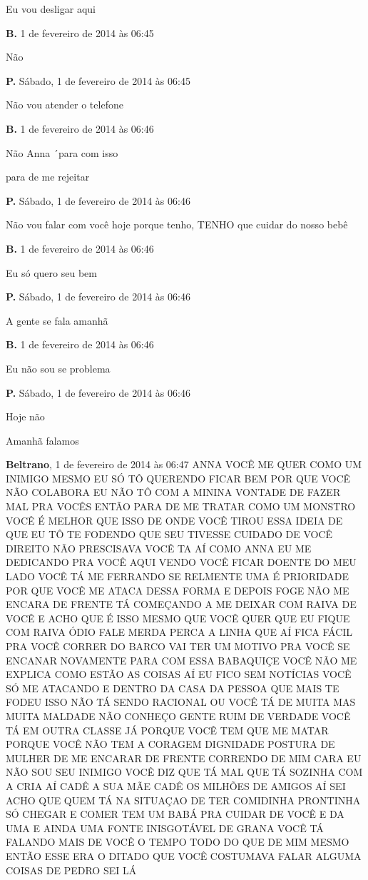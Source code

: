 Eu vou desligar aqui

\textbf{B.} 1 de fevereiro de 2014 às 06:45

Não

\textbf{P.} Sábado, 1 de fevereiro de 2014 às 06:45

Não vou atender o telefone

\textbf{B.} 1 de fevereiro de 2014 às 06:46

Não Anna ´para com isso

para de me rejeitar

\textbf{P.} Sábado, 1 de fevereiro de 2014 às 06:46

Não vou falar com você hoje porque tenho, TENHO que cuidar do nosso bebê

\textbf{B.} 1 de fevereiro de 2014 às 06:46

Eu só quero seu bem

\textbf{P.} Sábado, 1 de fevereiro de 2014 às 06:46

A gente se fala amanhã

\textbf{B.} 1 de fevereiro de 2014 às 06:46

Eu não sou se problema

\textbf{P.} Sábado, 1 de fevereiro de 2014 às 06:46

Hoje não

Amanhã falamos

\textbf{Beltrano}, 1 de fevereiro de 2014 às 06:47 ANNA VOCÊ ME QUER
COMO UM INIMIGO MESMO EU SÓ TÔ QUERENDO FICAR BEM POR QUE VOCÊ NÃO
COLABORA EU NÃO TÔ COM A MININA VONTADE DE FAZER MAL PRA VOCÊS ENTÃO
PARA DE ME TRATAR COMO UM MONSTRO VOCÊ É MELHOR QUE ISSO DE ONDE VOCÊ
TIROU ESSA IDEIA DE QUE EU TÔ TE FODENDO QUE SEU TIVESSE CUIDADO DE VOCÊ
DIREITO NÃO PRESCISAVA VOCÊ TA AÍ COMO ANNA EU ME DEDICANDO PRA VOCÊ
AQUI VENDO VOCÊ FICAR DOENTE DO MEU LADO VOCÊ TÁ ME FERRANDO SE RELMENTE
UMA É PRIORIDADE POR QUE VOCÊ ME ATACA DESSA FORMA E DEPOIS FOGE NÃO ME
ENCARA DE FRENTE TÁ COMEÇANDO A ME DEIXAR COM RAIVA DE VOCÊ E ACHO QUE É
ISSO MESMO QUE VOCÊ QUER QUE EU FIQUE COM RAIVA ÓDIO FALE MERDA PERCA A
LINHA QUE AÍ FICA FÁCIL PRA VOCÊ CORRER DO BARCO VAI TER UM MOTIVO PRA
VOCÊ SE ENCANAR NOVAMENTE PARA COM ESSA BABAQUIÇE VOCÊ NÃO ME EXPLICA
COMO ESTÃO AS COISAS AÍ EU FICO SEM NOTÍCIAS VOCÊ SÓ ME ATACANDO E
DENTRO DA CASA DA PESSOA QUE MAIS TE FODEU ISSO NÃO TÁ SENDO RACIONAL OU
VOCÊ TÁ DE MUITA MAS MUITA MALDADE NÃO CONHEÇO GENTE RUIM DE VERDADE
VOCÊ TÁ EM OUTRA CLASSE JÁ PORQUE VOCÊ TEM QUE ME MATAR PORQUE VOCÊ NÃO
TEM A CORAGEM DIGNIDADE POSTURA DE MULHER DE ME ENCARAR DE FRENTE
CORRENDO DE MIM CARA EU NÃO SOU SEU INIMIGO VOCÊ DIZ QUE TÁ MAL QUE TÁ
SOZINHA COM A CRIA AÍ CADÊ A SUA MÃE CADÊ OS MILHÕES DE AMIGOS AÍ SEI
ACHO QUE QUEM TÁ NA SITUAÇAO DE TER COMIDINHA PRONTINHA SÓ CHEGAR E
COMER TEM UM BABÁ PRA CUIDAR DE VOCÊ E DA UMA E AINDA UMA FONTE
INISGOTÁVEL DE GRANA VOCÊ TÁ FALANDO MAIS DE VOCÊ O TEMPO TODO DO QUE DE
MIM MESMO ENTÃO ESSE ERA O DITADO QUE VOCÊ COSTUMAVA FALAR ALGUMA COISAS
DE PEDRO SEI LÁ

